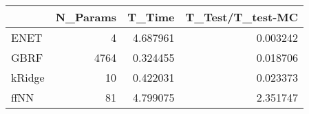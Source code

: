 \begin{tabular}{lrrr}
\toprule
{} &  N\_Params &    T\_Time &  T\_Test/T\_test-MC \\
\midrule
ENET   &         4 &  4.687961 &          0.003242 \\
GBRF   &      4764 &  0.324455 &          0.018706 \\
kRidge &        10 &  0.422031 &          0.023373 \\
ffNN   &        81 &  4.799075 &          2.351747 \\
\bottomrule
\end{tabular}
